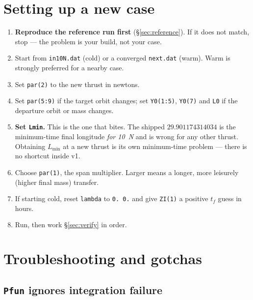 \documentclass[11pt]{article}
\newcommand{\code}[1]{\texttt{\small #1}}
\newcommand{\file}[1]{\texttt{\small #1}}
\begin{document}
\section{Setting up a new case}\label{sec:newcase}

\begin{enumerate}
\item \textbf{Reproduce the reference run first} (\S\ref{sec:reference}). If
      it does not match, stop --- the problem is your build, not your case.
\item Start from \file{in10N.dat} (cold) or a converged \file{next.dat}
      (warm). Warm is strongly preferred for a nearby case.
\item Set \code{par(2)} to the new thrust in newtons.
\item Set \code{par(5:9)} if the target orbit changes; set \code{Y0(1:5)},
      \code{Y0(7)} and \code{L0} if the departure orbit or mass changes.
\item \textbf{Set \code{Lmin}.} This is the one that bites. The shipped
      $29.901174314034$ is the minimum-time final longitude \emph{for 10~N}
      and is wrong for any other thrust. Obtaining $L_{\min}$ at a new thrust
      is its own minimum-time problem --- there is no shortcut inside v1.
\item Choose \code{par(1)}, the span multiplier. Larger means a longer, more
      leisurely (higher final mass) transfer.
\item If starting cold, reset \code{lambda} to \code{0. 0.} and give
      \code{ZI(1)} a positive $t_f$ guess in hours.
\item Run, then work \S\ref{sec:verify} in order.
\end{enumerate}

\section{Troubleshooting and gotchas}\label{sec:gotchas}

\subsection{\code{Pfun} ignores integration failure}\label{sec:rkf45}
\end{document}
